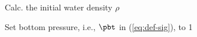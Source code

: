 \been

\item Calc. the initial water density $\rho$
\item Set bottom pressure, i.e.,  $\pbt$ in (\ref{eq:def-sig}), to 1

\enen
